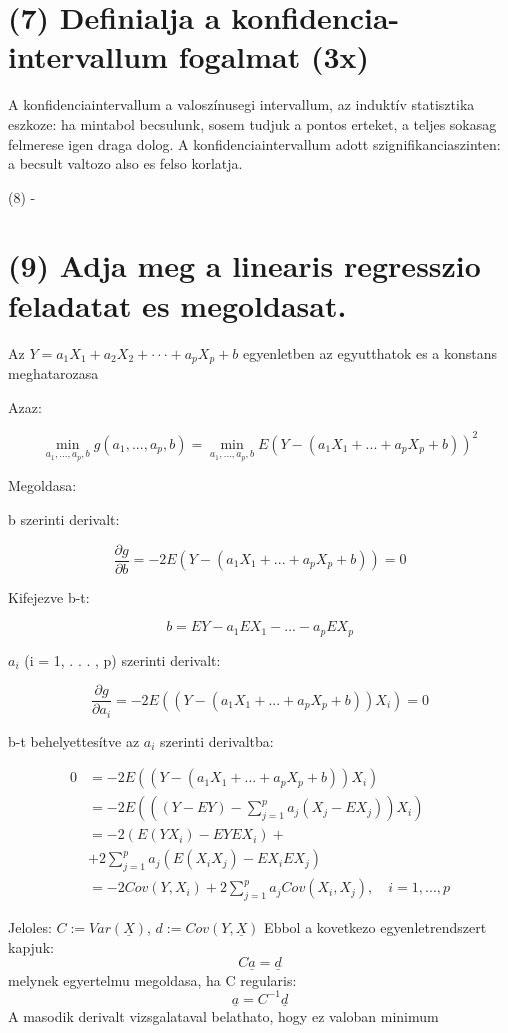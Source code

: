 \documentclass[12p]{article}
\begin{document}
\section{(7) Definialja a konfidencia-intervallum fogalmat (3x)}

A konfidenciaintervallum a valoszínusegi intervallum, az induktív statisztika eszkoze: ha mintabol becsulunk, sosem tudjuk a pontos erteket, a teljes sokasag felmerese igen draga dolog. A konfidenciaintervallum adott szignifikanciaszinten: a becsult valtozo also es felso korlatja.

(8) -

\section{(9) Adja meg a linearis regresszio feladatat es megoldasat.}

Az $Y = a_1X_1 + a_2X_2 + · · · + a_pX_p + b$ egyenletben az
egyutthatok es a konstans meghatarozasa

Azaz:

$$\min_{a_1, ..., a_p,b} g(a_1,...,a_p,b) = \min_{a_1,...,a_p,b} E(Y - (a_1X_1 + ... + a_pX_p+b))^2$$

Megoldasa:

b szerinti derivalt:

$$\frac{\partial g}{\partial b} = -2E(Y - (a_1X_1 + ... + a_pX_p + b)) = 0$$

Kifejezve b-t:

$$b = EY - a_1EX_1 - ... - a_pEX_p$$

$a_i$ (i = 1, . . . , p) szerinti derivalt:

$$\frac{\partial g}{\partial a_i} = -2E((Y-(a_1X_1 + ... + a_pX_p + b))X_i) = 0$$

b-t behelyettesítve az $a_i$ szerinti derivaltba:

\begin{align*}
0  &= -2E((Y - (a_1X_1 + ... + a_pX_p + b))X_i)\\
 &= -2E\left(\left((Y - EY) - \sum_{j = 1}^p a_j(X_j - EX_j)\right)X_i\right)\\
 &= -2(E(YX_i) - EYEX_i) +\\
 &+ 2 \sum_{j=1}^p a_j(E(X_iX_j) - EX_iEX_j)\\
 &= -2Cov(Y,X_i) + 2\sum_{j=1}^p a_j Cov(X_i,X_j), \quad i=1,...,p
\end{align*}

Jeloles: $C := Var(\underline{X})$, $d := Cov(Y, \underline{X})$
Ebbol a kovetkezo egyenletrendszert kapjuk:
$$C\underline{a} = \underline{d}$$
melynek egyertelmu megoldasa, ha C regularis:
$$\underline{a} = C^{-1}\underline{d}$$
A masodik derivalt vizsgalataval belathato, hogy ez
valoban minimum
\end{document}
